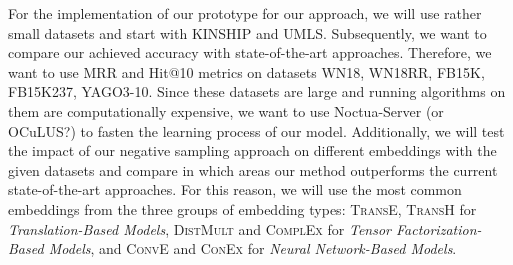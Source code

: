 For the implementation of our prototype for our approach, we will use rather small datasets and start with \textsc{KINSHIP} and \textsc{UMLS}.
Subsequently, we want to compare our achieved accuracy with state-of-the-art approaches.
Therefore, we want to use \ac{MRR} and Hit@10 metrics on datasets \textsc{WN18}, \textsc{WN18RR}, \textsc{FB15K}, \textsc{FB15K237}, \textsc{YAGO3-10}.
Since these datasets are large and running algorithms on them are computationally expensive, we want to use Noctua-Server (or OCuLUS?) to fasten the learning process of our model.
Additionally, we will test the impact of our negative sampling approach on different embeddings with the given datasets and compare in which areas our method outperforms the current state-of-the-art approaches.
For this reason, we will use the most common embeddings from the three groups of embedding types:
\textsc{TransE}, \textsc{TransH} for \textit{Translation-Based Models}, \textsc{DistMult} and \textsc{ComplEx} for \textit{Tensor Factorization-Based Models}, and \textsc{ConvE} and \textsc{ConEx} for \textit{Neural Network-Based Models}.



